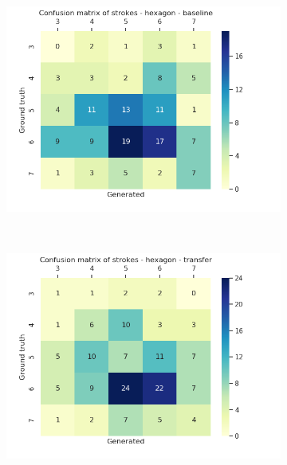     \begin{figure}[!htbp]\ContinuedFloat

      \begin{subfigure}[tb]{0.45\textwidth}
          \includegraphics[width=\textwidth]{images/sota/quickdraw_results/quickdraw_hexagon_target_strokes_heatmap.png}
      \end{subfigure}
      ~
      \begin{subfigure}[tb]{0.45\textwidth}
          \includegraphics[width=\textwidth]{images/sota/quickdraw_results/quickdraw_hexagon_transfer_strokes_heatmap.png}
      \end{subfigure}


\end{figure}
